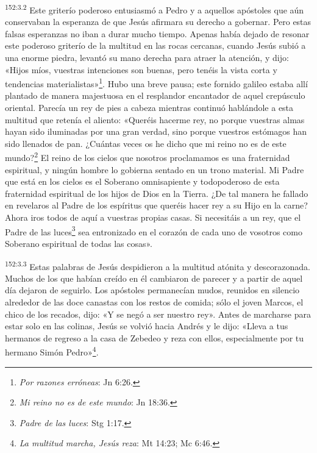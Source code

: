 \par 
\textsuperscript{152:3.2} Este griterío poderoso entusiasmó a Pedro y a aquellos apóstoles que aún conservaban la esperanza de que Jesús afirmara su derecho a gobernar. Pero estas falsas esperanzas no iban a durar mucho tiempo. Apenas había dejado de resonar este poderoso griterío de la multitud en las rocas cercanas, cuando Jesús subió a una enorme piedra, levantó su mano derecha para atraer la atención, y dijo: «Hijos míos, vuestras intenciones son buenas, pero tenéis la vista corta y tendencias materialistas»\footnote{\textit{Por razones erróneas}: Jn 6:26.}. Hubo una breve pausa; este fornido galileo estaba allí plantado de manera majestuosa en el resplandor encantador de aquel crepúsculo oriental. Parecía un rey de pies a cabeza mientras continuó hablándole a esta multitud que retenía el aliento: «Queréis hacerme rey, no porque vuestras almas hayan sido iluminadas por una gran verdad, sino porque vuestros estómagos han sido llenados de pan. ¿Cuántas veces os he dicho que mi reino no es de este mundo?\footnote{\textit{Mi reino no es de este mundo}: Jn 18:36.} El reino de los cielos que nosotros proclamamos es una fraternidad espiritual, y ningún hombre lo gobierna sentado en un trono material. Mi Padre que está en los cielos es el Soberano omnisapiente y todopoderoso de esta fraternidad espiritual de los hijos de Dios en la Tierra. ¿De tal manera he fallado en revelaros al Padre de los espíritus que queréis hacer rey a su Hijo en la carne? Ahora iros todos de aquí a vuestras propias casas. Si necesitáis a un rey, que el Padre de las luces\footnote{\textit{Padre de las luces}: Stg 1:17.} sea entronizado en el corazón de cada uno de vosotros como Soberano espiritual de todas las cosas».

\par 
\textsuperscript{152:3.3} Estas palabras de Jesús despidieron a la multitud atónita y descorazonada. Muchos de los que habían creído en él cambiaron de parecer y a partir de aquel día dejaron de seguirlo. Los apóstoles permanecían mudos, reunidos en silencio alrededor de las doce canastas con los restos de comida; sólo el joven Marcos, el chico de los recados, dijo: «Y se negó a ser nuestro rey». Antes de marcharse para estar solo en las colinas, Jesús se volvió hacia Andrés y le dijo: «Lleva a tus hermanos de regreso a la casa de Zebedeo y reza con ellos, especialmente por tu hermano Simón Pedro»\footnote{\textit{La multitud marcha, Jesús reza}: Mt 14:23; Mc 6:46.}.

